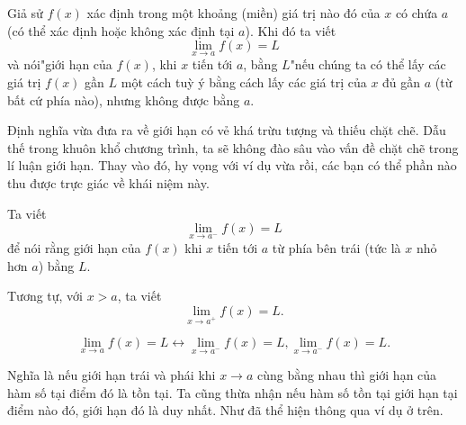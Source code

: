\begin{definition}
    Giả sử $f(x)$ xác định trong một khoảng (miền) giá trị nào đó của $x$ có chứa $a$ (có thể xác định hoặc không xác định tại $a$). Khi đó ta viết
    \begin{equation*}\lim_{x\rightarrow a}f(x)=L\end{equation*}
và nói\qquad\qquad\qquad "giới hạn của $f(x)$, khi $x$ tiến tới $a$, bằng $L$"\newline nếu chúng ta có thể lấy các giá trị $f(x)$ gần $L$ một cách tuỳ ý bằng cách lấy các giá trị của $x$ đủ gần $a$ (từ bất cứ phía nào), nhưng không được bằng $a$.
\end{definition}

Định nghĩa vừa đưa ra về giới hạn có vẻ khá trừu tượng và thiếu chặt chẽ. Dẫu thế trong khuôn khổ chương trình, ta sẽ không đào sâu vào vấn đề chặt chẽ trong lí luận giới hạn. Thay vào đó, hy vọng với ví dụ vừa rồi, các bạn có thể phần nào thu được trực giác về khái niệm này.\newline

\begin{definition}
    Ta viết \begin{equation*}\lim_{x\rightarrow a^-}f(x)=L\end{equation*}
để nói rằng giới hạn của $f(x)$ khi $x$ tiến tới $a$ từ phía bên trái (tức là $x$ nhỏ hơn $a$) bằng $L$. 
\end{definition}

Tương tự, với $x>a$, ta viết $$\lim_{x\rightarrow a^+}f(x)=L .$$ 
\begin{theorem}
    \begin{equation*}\lim_{x\rightarrow a}f(x)=L \leftrightarrow \lim_{x\rightarrow a^-}f(x)=L, \lim_{x\rightarrow a^-}f(x)=L.\end{equation*}   
\end{theorem}

Nghĩa là nếu giới hạn trái và phái khi $x\rightarrow a$ cùng bằng nhau thì giới hạn của hàm số tại điểm đó là tồn tại.
Ta cũng thừa nhận nếu hàm số tồn tại giới hạn tại điểm nào đó, giới hạn đó là duy nhất. Như đã thể hiện thông qua ví dụ ở trên.

